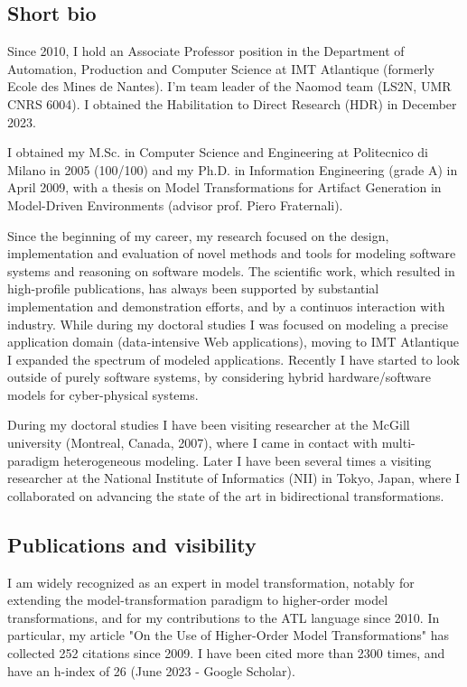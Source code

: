 
\subsection*{Short bio}

Since 2010, I hold an Associate Professor position in the Department of Automation, Production and Computer Science at IMT Atlantique (formerly Ecole des Mines de Nantes). I’m team leader of the Naomod team (LS2N, UMR CNRS 6004). I obtained the Habilitation to Direct Research (HDR) in December 2023.

I obtained my M.Sc. in Computer Science and Engineering at Politecnico di Milano in 2005 (100/100) and my Ph.D. in Information Engineering (grade A) in April 2009, with a thesis on Model Transformations for Artifact Generation in Model-Driven Environments (advisor prof. Piero Fraternali).

Since the beginning of my career, my research focused on the design, implementation and evaluation of novel methods and tools for modeling software systems and reasoning on software models. The scientific work, which resulted in high-profile publications, has always been supported by substantial implementation and demonstration efforts, and by a continuos interaction with industry. While during my doctoral studies I was focused on modeling a precise application domain (data-intensive Web applications), moving to IMT Atlantique I expanded the spectrum of modeled applications. Recently I have started to look outside of purely software systems, by considering hybrid hardware/software models for cyber-physical systems.

During my doctoral studies I have been visiting researcher at the McGill university (Montreal, Canada, 2007), where I came in contact with multi-paradigm heterogeneous modeling. Later I have been several times a visiting researcher at the National Institute of Informatics (NII) in Tokyo, Japan, where I collaborated on advancing the state of the art in bidirectional transformations.

\subsection*{Publications and visibility}

I am widely recognized as an expert in model transformation, notably for extending the model-transformation paradigm to higher-order model transformations, and for my contributions to the ATL language since 2010. In particular, my article "On the Use of Higher-Order Model Transformations" has collected 252 citations since 2009. I have been cited more than 2300 times, and have an h-index of 26 (June 2023 - Google Scholar).

